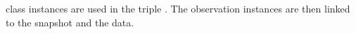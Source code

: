 																																																																																																																																																																																																																																																																																																																																																																																																															 class instances are used in the triple
																																																																																																																																																																																																																																																																																																																																																																																																															.
																																																																																																																																																																																																																																																																																																																																																																																																															The observation instances are then linked to the snapshot and the
																																																																																																																																																																																																																																																																																																																																																																																																															data.



